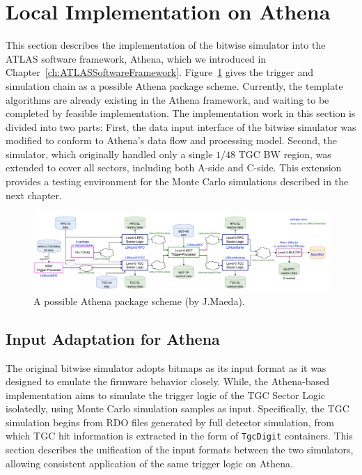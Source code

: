 \section{Local Implementation on Athena} \label{sec:LocalImplementationOnAthena}
This section describes the implementation of the bitwise simulator into the ATLAS software framework, Athena, which we introduced in Chapter~\ref{ch:ATLASSoftwareFramework}. Figure~\ref{fig:L0_trigger_chain} gives the trigger and simulation chain as a possible Athena package scheme. Currently, the template algorithms are already existing in the Athena framework, and waiting to be completed by feasible implementation. The implementation work in this section is divided into two parts: 
First, the data input interface of the bitwise simulator was modified to conform to Athena's data flow and processing model. Second, the simulator, which originally handled only a single \(1/48\) TGC BW region, was extended to cover all sectors, including both A-side and C-side. This extension provides a testing environment for the Monte Carlo simulations described in the next chapter.
\begin{figure}[htbp]
  \centering
  \includegraphics[width=1.0\textwidth]{figs/chapter5/L0_trigger_chain.png}
  \caption{A possible Athena package scheme (by J.Maeda).}
  \label{fig:L0_trigger_chain}
\end{figure}
\subsection{Input Adaptation for Athena} \label{subsec:InputAdaptation}
The original bitwise simulator adopts bitmaps as its input format as it was designed to emulate the firmware behavior closely. While, the Athena-based implementation aims to simulate the trigger logic of the TGC Sector Logic isolatedly, using Monte Carlo simulation samples as input. Specifically, the TGC simulation begins from RDO files generated by full detector simulation, from which TGC hit information is extracted in the form of \texttt{TgcDigit} containers. This section describes the unification of the input formats between the two simulators, allowing consistent application of the same trigger logic on Athena.

